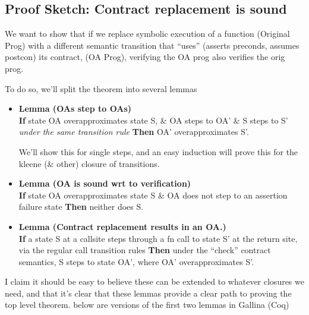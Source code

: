 \documentclass[12pt]{report}
\begin{document}
\subsection{Proof Sketch: Contract replacement is sound}

 We want to show that if we replace symbolic execution
        of a function (Original Prog) with a different semantic
        transition that ``uses'' (asserts preconds, assumes
        postcon) its contract, (OA Prog), verifying the OA prog also
        verifies the orig prog.


        To do so, we'll split the theorem into several lemmas



\begin{itemize}
\item  \textbf{Lemma (OAs step to OAs)}\\
            \textbf{If} state OA overapproximates state S, \&
            OA steps to OA' \&
            S steps to S' \textit{under the same transition rule}
            \textbf{Then} OA' overapproximates S'.


          We'll show this for single steps, and an easy induction
          will prove this for the kleene (\& other) closure of
          transitions.



\item  \textbf{Lemma (OA is sound wrt to verification)}\\
            \textbf{If} state OA overapproximates state S \&
            OA does not step to an assertion failure state
            \textbf{Then} neither does S.



\item  \textbf{Lemma (Contract replacement results in an OA.)}\\
            \textbf{If} a state S at a callsite steps through a fn call
            to state S' at the return site, via the regular call transition
            rules
            \textbf{Then} under the ``check'' contract semantics, S steps
            to state OA', where OA' overapproximates S'.



\end{itemize}
     I claim it should be easy to believe these can be extended to whatever closures we need,
        and that it's clear that these lemmas provide a clear path to proving the top level
        theorem. below are versions of the first two lemmas in Gallina (Coq)\\
    
\end{document}

